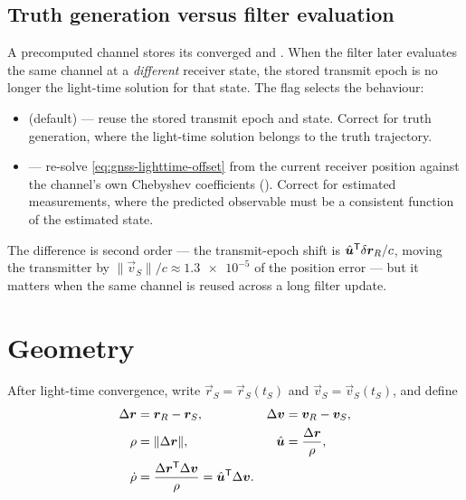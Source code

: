 \subsection{Truth generation versus filter evaluation}

A precomputed channel stores its converged  and
. When the filter later evaluates the same channel at a
\emph{different} receiver state, the stored transmit epoch is no longer the
light-time solution for that state. The flag
 selects the
behaviour:

\begin{itemize}[leftmargin=1.4em,itemsep=1pt]
  \item {} (default) --- reuse the stored transmit epoch and state.
    Correct for truth generation, where the light-time solution belongs to the
    truth trajectory.
  \item {} --- re-solve \cref{eq:gnss-lighttime-offset} from the
    current receiver position against the channel's own Chebyshev coefficients
    (). Correct for estimated measurements, where
    the predicted observable must be a consistent function of the estimated
    state.
\end{itemize}

The difference is second order --- the transmit-epoch shift is
$\hat{\bm{u}}^{\mathsf{T}}\delta\bm{r}_R/c$, moving the transmitter by
$\lVert\vec{v}_S\rVert/c \approx \num{1.3e-5}$ of the position error --- but it
matters when the same channel is reused across a long filter update.

\section{Geometry}
\label{sec:gnss-geometry}

After light-time convergence, write $\vec{r}_S = \vec{r}_S(t_S)$ and
$\vec{v}_S = \vec{v}_S(t_S)$, and define
\begin{align}
  \label{eq:gnss-delta}
  \Delta\bm{r} &= \bm{r}_R - \bm{r}_S, &
  \Delta\bm{v} &= \bm{v}_R - \bm{v}_S, \\
  \label{eq:gnss-range}
  \rho &= \lVert \Delta\bm{r} \rVert, &
  \hat{\bm{u}} &= \frac{\Delta\bm{r}}{\rho}, \\
  \label{eq:gnss-rangerate}
  \dot\rho &= \frac{\Delta\bm{r}^{\mathsf{T}} \Delta\bm{v}}{\rho}
            = \hat{\bm{u}}^{\mathsf{T}}\Delta\bm{v} . & &
\end{align}

